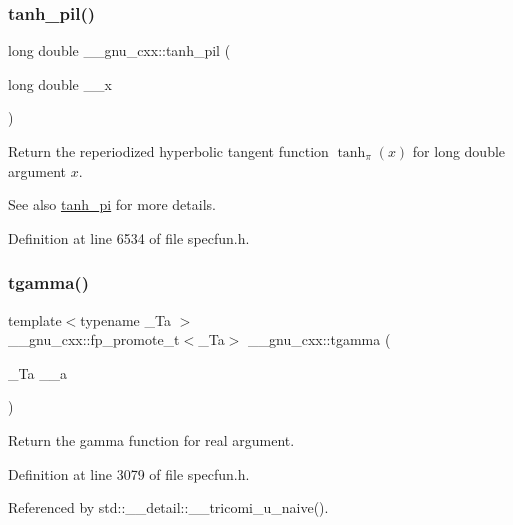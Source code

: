 \subsubsection{\texorpdfstring{tanh\+\_\+pil()}{tanh\_pil()}}
{\footnotesize\ttfamily long double \+\_\+\+\_\+gnu\+\_\+cxx\+::tanh\+\_\+pil (\begin{DoxyParamCaption}\item[{long double}]{\+\_\+\+\_\+x }\end{DoxyParamCaption})\hspace{0.3cm}{\ttfamily [inline]}}

Return the reperiodized hyperbolic tangent function $ \tanh_\pi(x) $ for {\ttfamily long double} argument $ x $.

\begin{DoxySeeAlso}{See also}
\hyperlink{group__gnu__math__spec__func_ga8729ffd5acf3266315e9dac1b5a9b3a6}{tanh\+\_\+pi} for more details. 
\end{DoxySeeAlso}


Definition at line 6534 of file specfun.\+h.

\mbox{\label{group__gnu__math__spec__func_ga73a634663e4eceb1e6bcf3fc16773b7b}} 
\subsubsection{\texorpdfstring{tgamma()}{tgamma()}\hspace{0.1cm}{\footnotesize\ttfamily [1/3]}}
{\footnotesize\ttfamily template$<$typename \+\_\+\+Ta $>$ \\
\+\_\+\+\_\+gnu\+\_\+cxx\+::fp\+\_\+promote\+\_\+t$<$\+\_\+\+Ta$>$ \+\_\+\+\_\+gnu\+\_\+cxx\+::tgamma (\begin{DoxyParamCaption}\item[{\+\_\+\+Ta}]{\+\_\+\+\_\+a }\end{DoxyParamCaption})\hspace{0.3cm}{\ttfamily [inline]}}

Return the gamma function for real argument. 

Definition at line 3079 of file specfun.\+h.



Referenced by std\+::\+\_\+\+\_\+detail\+::\+\_\+\+\_\+tricomi\+\_\+u\+\_\+naive().

